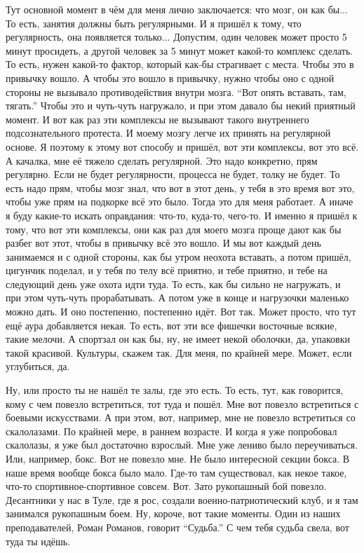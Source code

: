 \I
Тут основной момент в чём для меня лично заключается:
что мозг, он как бы...
То есть, занятия должны быть регулярными.
И я пришёл к тому, что регулярность, она появляется только...
Допустим, один человек может просто 5 минут просидеть,
а другой человек за 5 минут может какой-то комплекс сделать.
То есть, нужен какой-то фактор, который как-бы страгивает с места.
Чтобы это в привычку вошло.
А чтобы это вошло в привычку, нужно
чтобы оно с одной стороны не вызывало противодействия внутри мозга.
``Вот опять вставать, там, тягать.''
Чтобы это и чуть-чуть нагружало, и при этом давало бы некий приятный момент.
И вот как раз эти комплексы не вызывают такого внутреннего подсознательного протеста.
И моему мозгу легче их принять на регулярной основе.
Я поэтому к этому вот способу и пришёл, вот эти комплексы, вот это всё.
А качалка, мне её тяжело сделать регулярной.
Это надо конкретно, прям регулярно.
Если не будет регулярности, процесса не будет, толку не будет.
То есть надо прям,
чтобы мозг знал, что вот в этот день, у тебя в это время вот это,
чтобы уже прям на подкорке всё это было.
Тогда это для меня работает.
А иначе я буду какие-то искать оправдания: что-то, куда-то, чего-то.
И именно я пришёл к тому, что вот эти комплексы, они как раз для моего мозга
проще дают как бы разбег вот этот, чтобы в привычку всё это вошло.
И мы вот каждый день занимаемся и с одной стороны,
как бы утром неохота вставать, а потом
пришёл, цигунчик поделал,
и у тебя по телу всё приятно, и тебе приятно,
и тебе на следующий день уже охота
идти туда.
То есть, как бы
сильно не нагружать, и при этом
чуть-чуть прорабатывать. А потом уже
в конце и нагрузочки маленько можно
дать. И оно постепенно,
постепенно идёт.
Вот так.
Может просто, что
тут ещё аура добавляется некая.
То есть, вот эти все
фишечки восточные всякие,
такие мелочи. А спортзал
он как бы, ну, не
имеет некой
оболочки, да, упаковки
такой красивой.
Культуры, скажем так. Для меня,
по крайней мере. Может, если углубиться, да.

\A
Ну, или просто ты не нашёл
те залы, где это есть.
То есть, тут, как говорится, кому
с чем повезло
встретиться,
тот туда и пошёл.
Мне вот повезло встретиться
с боевыми искусствами.
А при этом, вот, например, мне
не повезло встретиться со скалолазами.
По крайней мере,
в раннем возрасте.
И когда я уже попробовал
скалолазы, я уже был достаточно взрослый.
Мне уже лениво было переучиваться.
Или, например, бокс.
Вот не повезло мне.
Не было интересной
секции бокса.
В наше время вообще бокса было мало.
Где-то там существовал,
как некое такое, что-то
спортивное-спортивное совсем.
Вот.
Зато рукопашный бой повезло.
Десантники у нас
в Туле, где я рос,
создали военно-патриотический
клуб, и я там занимался
рукопашным боем.
Ну, короче, вот
такие моменты.
Один из наших
преподавателей, Роман Романов,
говорит ``Судьба.''
С чем тебя судьба свела,
вот туда ты идёшь.

